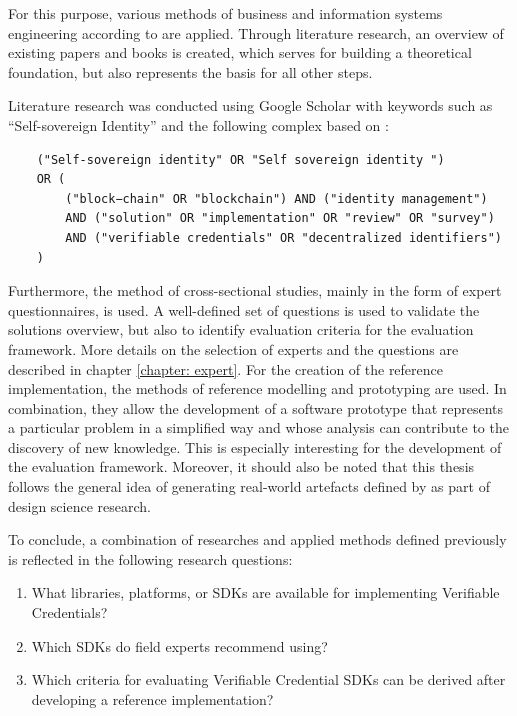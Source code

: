     For this purpose, various methods of business and information systems engineering according to \cite{wilde_forschungsmethoden_2007} are applied. Through literature research, an overview of existing papers and books is created, which serves for building a theoretical foundation, but also represents the basis for all other steps. 
    
    Literature research was conducted using Google Scholar with keywords such as “Self-sovereign Identity” and the following complex based on \cite{van_bokkem_self-sovereign_2019}:
    \begin{verbatim}
    ("Self-sovereign identity" OR "Self sovereign identity ") 
    OR ( 
        ("block−chain" OR "blockchain") AND ("identity management")
        AND ("solution" OR "implementation" OR "review" OR "survey")            
        AND ("verifiable credentials" OR "decentralized identifiers")
    )
    \end{verbatim}
    Furthermore, the method of cross-sectional studies, mainly in the form of expert questionnaires, is used. A well-defined set of questions is used to validate the solutions overview, but also to identify evaluation criteria for the evaluation framework. More details on the selection of experts and the questions are described in chapter \ref{chapter: expert}. For the creation of the reference implementation, the methods of reference modelling and prototyping are used. In combination, they allow the development of a software prototype that represents a particular problem in a simplified way and whose analysis can contribute to the discovery of new knowledge. This is especially interesting for the development of the evaluation framework. Moreover, it should also be noted that this thesis follows the general idea of generating real-world artefacts defined by \cite{hevner_three_2007} as part of design science research.
    
    To conclude, a combination of researches and applied methods defined previously is reflected in the following research questions: 
    
    \begin{enumerate}[label=RQ\arabic*:]
      \item What libraries, platforms, or SDKs are available for implementing Verifiable Credentials?
      \item Which SDKs do field experts recommend using?
      \item Which criteria for evaluating Verifiable Credential SDKs can be derived after developing a reference implementation?
    \end{enumerate}